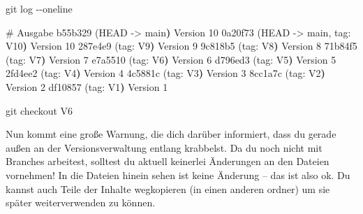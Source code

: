 \documentclass[
  ngerman,
  letterpaper,
  DIV=11]{scrreprt}
\newenvironment{Shaded}{\begin{snugshade}}{\end{snugshade}}
\newcommand{\AttributeTok}[1]{\textcolor[rgb]{0.40,0.45,0.13}{#1}}
\newcommand{\CommentTok}[1]{\textcolor[rgb]{0.37,0.37,0.37}{#1}}
\newcommand{\ErrorTok}[1]{\textcolor[rgb]{0.68,0.00,0.00}{#1}}
\newcommand{\ExtensionTok}[1]{\textcolor[rgb]{0.00,0.23,0.31}{#1}}
\newcommand{\FunctionTok}[1]{\textcolor[rgb]{0.28,0.35,0.67}{#1}}
\newcommand{\KeywordTok}[1]{\textcolor[rgb]{0.00,0.23,0.31}{\textbf{#1}}}
\newcommand{\NormalTok}[1]{\textcolor[rgb]{0.00,0.23,0.31}{#1}}
\newcommand{\OperatorTok}[1]{\textcolor[rgb]{0.37,0.37,0.37}{#1}}
\begin{document}
\begin{Shaded}
\begin{Highlighting}[]
\FunctionTok{git}\NormalTok{ log }\AttributeTok{{-}{-}oneline}

\CommentTok{\# Ausgabe}
\ExtensionTok{b55b329} \ErrorTok{(}\ExtensionTok{HEAD} \AttributeTok{{-}}\OperatorTok{\textgreater{}}\NormalTok{ main}\KeywordTok{)} \ExtensionTok{Version}\NormalTok{ 10}
\ExtensionTok{0a20f73} \ErrorTok{(}\ExtensionTok{HEAD} \AttributeTok{{-}}\OperatorTok{\textgreater{}}\NormalTok{ main, tag: V10}\KeywordTok{)} \ExtensionTok{Version}\NormalTok{ 10}
\ExtensionTok{287e4e9} \ErrorTok{(}\ExtensionTok{tag:}\NormalTok{ V9}\KeywordTok{)} \ExtensionTok{Version}\NormalTok{ 9}
\ExtensionTok{9c818b5} \ErrorTok{(}\ExtensionTok{tag:}\NormalTok{ V8}\KeywordTok{)} \ExtensionTok{Version}\NormalTok{ 8}
\ExtensionTok{71b84f5} \ErrorTok{(}\ExtensionTok{tag:}\NormalTok{ V7}\KeywordTok{)} \ExtensionTok{Version}\NormalTok{ 7}
\ExtensionTok{e7a5510} \ErrorTok{(}\ExtensionTok{tag:}\NormalTok{ V6}\KeywordTok{)} \ExtensionTok{Version}\NormalTok{ 6}
\ExtensionTok{d796ed3} \ErrorTok{(}\ExtensionTok{tag:}\NormalTok{ V5}\KeywordTok{)} \ExtensionTok{Version}\NormalTok{ 5}
\ExtensionTok{2fd4ee2} \ErrorTok{(}\ExtensionTok{tag:}\NormalTok{ V4}\KeywordTok{)} \ExtensionTok{Version}\NormalTok{ 4}
\ExtensionTok{4c5881c} \ErrorTok{(}\ExtensionTok{tag:}\NormalTok{ V3}\KeywordTok{)} \ExtensionTok{Version}\NormalTok{ 3}
\ExtensionTok{8cc1a7c} \ErrorTok{(}\ExtensionTok{tag:}\NormalTok{ V2}\KeywordTok{)} \ExtensionTok{Version}\NormalTok{ 2}
\ExtensionTok{df10857} \ErrorTok{(}\ExtensionTok{tag:}\NormalTok{ V1}\KeywordTok{)} \ExtensionTok{Version}\NormalTok{ 1}
\end{Highlighting}
\end{Shaded}

\begin{Shaded}
\begin{Highlighting}[]
\FunctionTok{git}\NormalTok{ checkout V6}
\end{Highlighting}
\end{Shaded}

Nun kommt eine große Warnung, die dich darüber informiert, dass du
gerade außen an der Versionsverwaltung entlang krabbelst. Da du noch
nicht mit Branches arbeitest, solltest du aktuell keinerlei Änderungen
an den Dateien vornehmen! In die Dateien hinein sehen ist keine Änderung
-- das ist also ok. Du kannst auch Teile der Inhalte wegkopieren (in
einen anderen ordner) um sie später weiterverwenden zu können.
\end{document}
